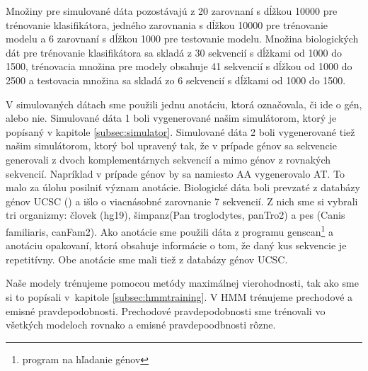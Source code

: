 Množiny pre simulované dáta pozostávajú z 20 zarovnaní s dĺžkou 10000 pre trénovanie klasifikátora, jedného zarovnania s dĺžkou 10000 pre trénovanie modelu a 6 zarovnaní s dĺžkou 1000 pre testovanie modelu.
Množina biologických dát pre trénovanie klasifikátora sa skladá z 30 sekvencií s dĺžkami od 1000 do 1500, trénovacia množina pre modely obsahuje 41 sekvencií s dĺžkou od 1000 do 2500 a testovacia množina sa skladá zo 6 sekvencií s dĺžkami od 1000 do 1500.

V simulovaných dátach sme použili jednu anotáciu, ktorá označovala, či ide o gén, alebo nie.
Simulované dáta 1 boli vygenerované našim simulátorom, ktorý je popísaný v kapitole \ref{subsec:simulator}.
Simulované dáta 2 boli vygenerované tiež našim simulátorom, ktorý bol upravený tak, že v prípade génov sa sekvencie generovali z dvoch komplementárnych sekvencií a mimo génov z rovnakých sekvencií. Napríklad v prípade génov by sa namiesto AA vygenerovalo AT. To malo za úlohu posilniť význam anotácie.
Biologické dáta boli prevzaté z databázy génov UCSC (\cite{karolchik2003ucsc}) a išlo o viacnásobné zarovnanie 7 sekvencií.
Z nich sme si vybrali tri organizmy: človek (hg19), šimpanz(Pan troglodytes, panTro2) a pes (Canis familiaris, canFam2).
Ako anotácie sme použili dáta z programu genscan\footnote{program na hľadanie génov} a anotáciu opakovaní, ktorá obsahuje informácie o tom, že daný kus sekvencie je repetitívny. Obe anotácie sme mali tiež z databázy génov UCSC.


Naše modely trénujeme pomocou metódy maximálnej vierohodnosti, tak ako sme si to popísali v~kapitole \ref{subsec:hmmtraining}. V HMM trénujeme prechodové a emisné pravdepodobnosti. Prechodové pravdepodobnosti sme trénovali vo všetkých modeloch rovnako a emisné pravdepoodbnosti rôzne.

